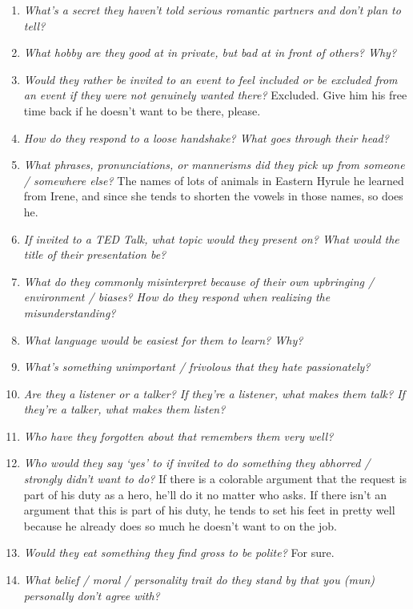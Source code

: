 \begin{enumerate}
    \item\textit{What’s a secret they haven’t told serious romantic partners and don’t plan to tell?} 
    \item\textit{What hobby are they good at in private, but bad at in front of others? Why?}
    \item\textit{Would they rather be invited to an event to feel included or be excluded from an event if they were not genuinely wanted there?}
        Excluded. Give him his free time back if he doesn't want to be there, please.
    \item\textit{How do they respond to a loose handshake? What goes through their head?}
    \item\textit{What phrases, pronunciations, or mannerisms did they pick up from someone / somewhere else?}
        The names of lots of animals in Eastern Hyrule he learned from Irene, and since she tends to shorten the vowels in those names, so does he. 
    \item\textit{If invited to a TED Talk, what topic would they present on? What would the title of their presentation be?}
    \item\textit{What do they commonly misinterpret because of their own upbringing / environment / biases? How do they respond when realizing the misunderstanding?}
    \item\textit{What language would be easiest for them to learn? Why?}
    \item\textit{What’s something unimportant / frivolous that they hate passionately?} 
    \item\textit{Are they a listener or a talker? If they’re a listener, what makes them talk? If they’re a talker, what makes them listen?}
    \item\textit{Who have they forgotten about that remembers them very well?}
    \item\textit{Who would they say ‘yes’ to if invited to do something they abhorred / strongly didn’t want to do?} If there is a colorable argument that the request is part of his duty as a hero, he'll do it no matter who asks. If there isn't an argument that this is part of his duty, he tends to set his feet in pretty well because he already does so much he doesn't want to on the job.
    \item\textit{Would they eat something they find gross to be polite?}
        For sure.
    \item\textit{What belief / moral / personality trait do they stand by that you (mun) personally don’t agree with?}

\end{enumerate}
